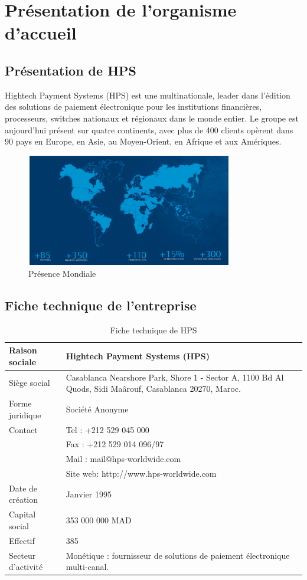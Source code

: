 \section{Présentation de l’organisme d’accueil}
\subsection{Présentation de HPS}
Hightech Payment Systems (HPS) est une multinationale, leader dans l'édition des solutions de paiement électronique pour les institutions financières, processeurs, switches nationaux et régionaux dans le monde entier. Le groupe est aujourd’hui présent sur quatre continents, avec plus de 400 clients opèrent dans 90 pays en Europe, en Asie, au Moyen-Orient, en Afrique et aux Amériques.
\begin{figure}[h!]  
  \centering
    \includegraphics[width=0.8\textwidth]{chapitre1/Figures/presentationGeoHps.png}
  \caption{Présence Mondiale}
\end{figure}

\subsection{Fiche technique de l’entreprise}
\begin{table}[!h]
\begin{tabular}{|p{4cm}||p{7cm}|}
\hline
Raison sociale & Hightech Payment Systems (HPS) \\
\hline
Siège social & Casablanca Nearshore Park, Shore 1 - Sector A, 1100 Bd Al Quods, Sidi Maârouf, Casablanca 20270, Maroc. \\
\hline
Forme juridique & Société Anonyme \\
\hline
Contact  & Tel : +212 529 045 000\\
& Fax : +212 529 014 096/97\\
& Mail : mail@hps-worldwide.com\\
& Site web: http://www.hps-worldwide.com\\
\hline
Date de création  & Janvier 1995 \\
\hline
Capital social  & 353 000 000 MAD \\
\hline
Effectif   & 385 \\
\hline
Secteur d’activité  & Monétique : fournisseur de solutions de paiement électronique multi-canal. \\
\hline
\end{tabular}
\centering \caption{Fiche technique de HPS} \label{TablePR}
\end{table}
